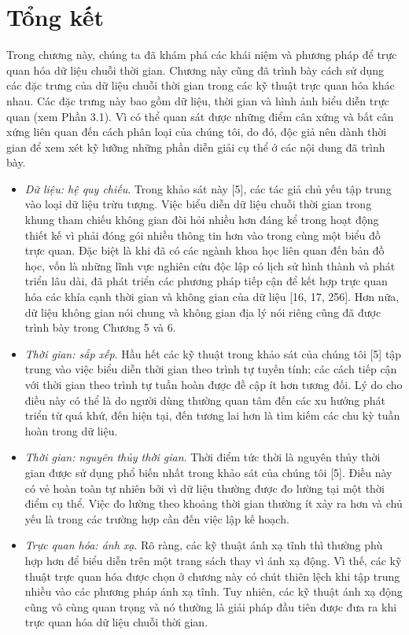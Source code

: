 \section{Tổng kết}
Trong chương này, chúng ta đã khám phá các khái niệm và phương pháp để trực quan hóa dữ liệu chuỗi thời gian. Chương này cũng đã trình bày cách sử dụng các đặc trưng của dữ liệu chuỗi thời gian trong các kỹ thuật trực quan hóa khác nhau. Các đặc trưng này bao gồm dữ liệu, thời gian và hình ảnh biểu diễn trực quan (xem Phần 3.1). Vì có thể quan sát được những điểm cân xứng và bất cân xứng liên quan đến cách phân loại của chúng tôi, do đó, độc giả nên dành thời gian để xem xét kỹ lưỡng những phần diễn giải cụ thể ở các nội dung đã trình bày.
\begin{itemize}
    \item \textit{Dữ liệu: hệ quy chiếu}. Trong khảo sát này [5], các tác giả chủ yếu tập trung vào loại dữ liệu trừu tượng. Việc biểu diễn dữ liệu chuỗi thời gian trong khung tham chiếu không gian đòi hỏi nhiều hơn đáng kể trong hoạt động thiết kế vì phải đóng gói nhiều thông tin hơn vào trong cùng một biểu đồ trực quan. Đặc biệt là khi đã có các ngành khoa học liên quan đến bản đồ học, vốn là những lĩnh vực nghiên cứu độc lập có lịch sử hình thành và phát triển lâu dài, đã phát triển các phương pháp tiếp cận để kết hợp trực quan hóa các khía cạnh thời gian và không gian của dữ liệu [16, 17, 256]. Hơn nữa, dữ liệu không gian nói chung và không gian địa lý nói riêng cũng đã được trình bày trong Chương 5 và 6.
    \item \textit{Thời gian: sắp xếp}. Hầu hết các kỹ thuật trong khảo sát của chúng tôi [5] tập trung vào việc biểu diễn thời gian theo trình tự tuyến tính; các cách tiếp cận với thời gian theo trình tự tuần hoàn được đề cập ít hơn tương đối. Lý do cho điều này có thể là do người dùng thường quan tâm đến các xu hướng phát triển từ quá khứ, đến hiện tại, đến tương lai hơn là tìm kiếm các chu kỳ tuần hoàn trong dữ liệu.
    \item \textit{Thời gian: nguyên thủy thời gian}. Thời điểm tức thời là nguyên thủy thời gian được sử dụng phổ biến nhất trong khảo sát của chúng tôi [5]. Điều này có vẻ hoàn toàn tự nhiên bởi vì dữ liệu thường được đo lường tại một thời điểm cụ thể. Việc đo lường theo khoảng thời gian thường ít xảy ra hơn và chủ yếu là trong các trường hợp cần đến việc lập kế hoạch.
    \item \textit{Trực quan hóa: ánh xạ}. Rõ ràng, các kỹ thuật ánh xạ tĩnh thì thường phù hợp hơn để biểu diễn trên một trang sách thay vì ánh xạ động. Vì thế, các kỹ thuật trực quan hóa được chọn ở chương này có chút thiên lệch khi tập trung nhiều vào các phương pháp ánh xạ tĩnh. Tuy nhiên, các kỹ thuật ánh xạ động cũng vô cùng quan trọng và nó thường là giải pháp đầu tiên được đưa ra khi trực quan hóa dữ liệu chuỗi thời gian.

\end{itemize}
